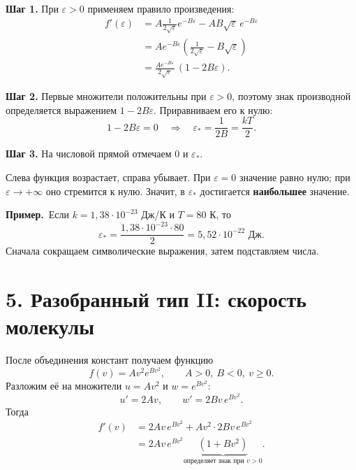 \documentclass[a4paper,12pt]{article}
\newcommand{\ex}[1]{\par\noindent\textcolor{accentdark}{\textbf{Пример.}}\ #1\par}
\begin{document}
\textbf{Шаг 1.} При $\varepsilon>0$ применяем правило произведения:
\begin{align*}
 f'(\varepsilon)
 &=A\frac1{2\sqrt\varepsilon}e^{-B\varepsilon}
 -AB\sqrt\varepsilon\,e^{-B\varepsilon}\\
 &=A e^{-B\varepsilon}\left(\frac1{2\sqrt\varepsilon}-B\sqrt\varepsilon\right)\\
 &=\frac{Ae^{-B\varepsilon}}{2\sqrt\varepsilon}\,(1-2B\varepsilon).
\end{align*}

\textbf{Шаг 2.} Первые множители положительны при $\varepsilon>0$, поэтому знак производной определяется выражением $1-2B\varepsilon$. Приравниваем его к нулю:
\[
1-2B\varepsilon=0
\quad\Longrightarrow\quad
\varepsilon_*=\frac1{2B}=\boxed{\frac{kT}{2}}.
\]

\textbf{Шаг 3.} На числовой прямой отмечаем $0$ и $\varepsilon_*$.
\begin{center}
\end{center}
Слева функция возрастает, справа убывает. При $\varepsilon=0$ значение равно нулю; при $\varepsilon\to+\infty$ оно стремится к нулю. Значит, в $\varepsilon_*$ достигается \textbf{наибольшее} значение.

\ex{Если $k=1{,}38\cdot10^{-23}$ Дж/К и $T=80$ К, то
\[
\varepsilon_*=\frac{1{,}38\cdot10^{-23}\cdot80}{2}
=\boxed{5{,}52\cdot10^{-22}\text{ Дж}}.
\]
Сначала сокращаем символические выражения, затем подставляем числа.}
\section*{5. Разобранный тип II: скорость молекулы}
После объединения констант получаем функцию
\[
 f(v)=Av^2e^{Bv^2},\qquad A>0,\ B<0,\ v\ge0.
\]
Разложим её на множители $u=Av^2$ и $w=e^{Bv^2}$:
\[
 u'=2Av,\qquad w'=2Bv\,e^{Bv^2}.
\]
Тогда
\begin{align*}
 f'(v)&=2Av\,e^{Bv^2}+Av^2\cdot2Bv\,e^{Bv^2}\\
 &=2Av\,e^{Bv^2}\underbrace{(1+Bv^2)}_{\text{определяет знак при }v>0}.
\end{align*}
\end{document}
